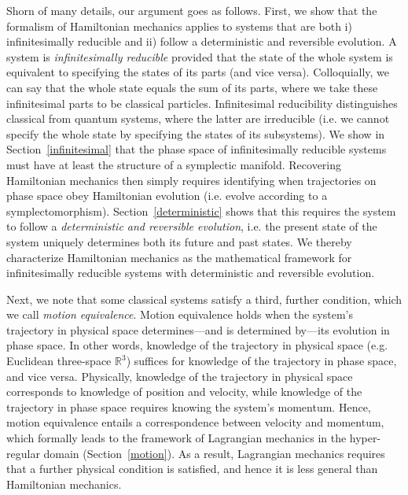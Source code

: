 \documentclass[12pt, english, twoside]{article} %
\begin{document}

Shorn of many details, our argument goes as follows. First, we show that the formalism of Hamiltonian mechanics applies to systems that are both i) infinitesimally reducible and ii) follow a deterministic and reversible evolution. A system is \textit{infinitesimally reducible} provided that the state of the whole system is equivalent to specifying the states of its parts (and vice versa). Colloquially, we can say that the whole state equals the sum of its parts, where we take these infinitesimal parts to be classical particles. Infinitesimal reducibility distinguishes classical from quantum systems, where the latter are irreducible (i.e. we cannot specify the whole state by specifying the states of its subsystems). We show in Section~\ref{infinitesimal} that the phase space of infinitesimally reducible systems must have at least the structure of a symplectic manifold. Recovering Hamiltonian mechanics then simply requires identifying when trajectories on phase space obey Hamiltonian evolution  (i.e. evolve according to a symplectomorphism). Section~\ref{deterministic} shows that this requires the system to follow a \textit{deterministic and reversible evolution}, i.e. the present state of the system uniquely determines both its future and past states. We thereby characterize Hamiltonian mechanics as the mathematical framework for infinitesimally reducible systems with deterministic and reversible evolution.  

Next, we note that some classical systems satisfy a third, further condition, which we call \textit{motion equivalence}. Motion equivalence holds when the system's trajectory in physical space determines---and is determined by---its evolution in phase space. In other words, knowledge of the trajectory in physical space (e.g. Euclidean three-space $\mathbb{R}^3$) suffices for knowledge of the trajectory in phase space, and vice versa. Physically, knowledge of the trajectory in physical space corresponds to knowledge of position and velocity, while knowledge of the trajectory in phase space requires knowing the system's momentum. Hence, motion equivalence entails a correspondence between velocity and momentum, which formally leads to the framework of Lagrangian mechanics in the hyper-regular domain (Section~\ref{motion}). As a result, Lagrangian mechanics requires that a further physical condition is satisfied, and hence it is less general than Hamiltonian mechanics. 
\end{document}
